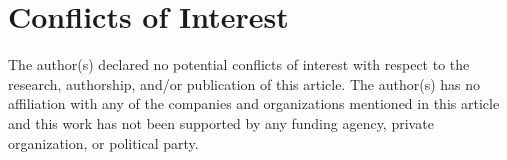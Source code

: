 \section{Conflicts of Interest}

The author(s) declared no potential conflicts of interest with respect to the research, authorship, and/or publication of this article. The author(s) has no affiliation with any of the companies and organizations mentioned in this article and this work has not been supported by any funding agency, private organization, or political party.